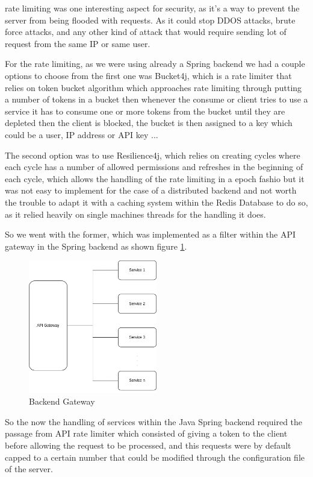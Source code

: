 rate limiting was one interesting aspect for security, as it's a way to prevent the
server from being flooded with requests. As it could stop DDOS attacks, brute force
attacks, and any other kind of attack that would require sending lot of request from 
the same IP or same user.

For the rate limiting, as we were using already a Spring backend we had a couple options
to choose from the first one was Bucket4j, which is a rate limiter that relies on token
bucket algorithm which approaches rate limiting through putting a number of tokens in a
bucket then whenever the consume or client tries to use a service it has to consume one
or more tokens from the bucket until they are depleted then the client is blocked,
the bucket is then assigned to a key which could be a user, IP address or API key ...

The second option was to use Resilience4j, which relies on creating cycles where each cycle
has a number of allowed permissions and refreshes in the beginning of each cycle, which
allows the handling of the rate limiting in a epoch fashio but it was not easy to
implement for the case of a distributed backend and not worth the trouble to adapt it
with a caching system within the Redis Database to do so, as it relied heavily on
single machines threads for the handling it does.

So we went with the former, which was implemented as a filter within the API gateway
in the Spring backend as shown figure \ref{fig:b4j}.

\begin{figure}[!htpb]
    \centering
    \includegraphics[width=0.5\textwidth]{images/ratelimiting.png}
    \caption{\footnotesize{Backend Gateway}}
    \label{fig:b4j}
\end{figure}


So the now the handling of services within the Java Spring backend required the passage
from API rate limiter which consisted of giving a token to the client before allowing
the request to be processed, and this requests were by default capped to a certain number
that could be modified through the configuration file of the server.

